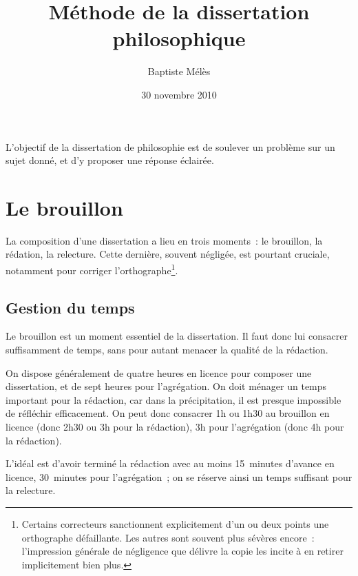 \documentclass[a4paper,11pt]{article}
\author{Baptiste Mélès}
\title{Méthode de la dissertation philosophique}
\date{30 novembre 2010}
\begin{document}
\maketitle

L'objectif de la dissertation de philosophie est de soulever un problème
sur un sujet donné, et d'y proposer une réponse éclairée.


\tableofcontents

\par




\section{Le brouillon}

La composition d'une dissertation a lieu en trois moments~: le
brouillon, la rédation, la relecture. Cette dernière, souvent négligée,
est pourtant cruciale, notamment pour corriger
l'orthographe\footnote{Certains correcteurs sanctionnent explicitement
  d'un ou deux points une orthographe défaillante. Les autres sont
  souvent plus sévères encore~: l'impression générale de négligence que
  délivre la copie les incite à en retirer implicitement bien plus.}.

\par

\subsection{Gestion du temps}

Le brouillon est un moment essentiel de la dissertation. Il faut donc
lui consacrer suffisamment de temps, sans pour autant menacer la qualité
de la rédaction.

\par

On dispose généralement de quatre heures en licence pour composer une
dissertation, et de sept heures pour l'agrégation. On doit ménager un
temps important pour la rédaction, car dans la précipitation, il est
presque impossible de réfléchir efficacement. On peut donc consacrer 1h
ou 1h30 au brouillon en licence (donc 2h30 ou 3h pour la rédaction), 3h
pour l'agrégation (donc 4h pour la rédaction).

\par

L'idéal est d'avoir terminé la rédaction avec au moins 15~minutes
d'avance en licence, 30~minutes pour l'agrégation~; on se réserve ainsi
un temps suffisant pour la relecture.
\end{document}
